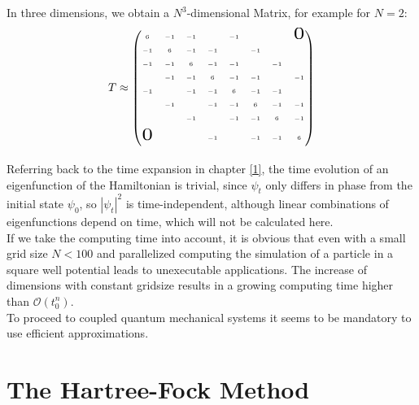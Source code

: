 \documentclass[twoside,        %
			   11pt,			%
               BCOR10mm,       %
               ngerman,english  %
               ]{scrartcl}
\begin{document}
In three dimensions, we obtain a $N^3$-dimensional Matrix, for example for $N=2$:
\begin{align*}
T \approx
\tiny
\begin{pmatrix}
 6 & -1 & -1 &  & -1 &  &  & \scalebox{3}{$0$}  \\\\
   -1 & 6 & -1 & -1 &  & -1 &  & \\\\
     -1 & -1 & 6 & -1 & -1 &  & -1 & \\\\
        & -1 & -1 & 6 & -1 & -1 &  & -1\\\\
        -1 &  & -1 & -1 & 6 & -1 & -1 & \\\\
           & -1 &  & -1 & -1 & 6 & -1 & -1\\\\
             &  & -1 &  & -1 & -1 & 6 & -1\\\\
              \scalebox{3}{$0$}  &  &  & -1 &  & -1 & -1 & 6\\\\
              \end{pmatrix}
\end{align*}

Referring back to the time expansion in chapter \ref{1}, the time evolution of an eigenfunction of the Hamiltonian is trivial, since $\psi_t$ only differs in phase from the initial state $\psi_0$, so ${|\psi_t|}^2$ is time-independent, although linear combinations of eigenfunctions depend on time, which will not be calculated here.\\

If we take the computing time into account, it is obvious that even with a small grid size $N<100$ and parallelized computing the simulation of a particle in a square well potential leads to unexecutable applications. The increase of dimensions with constant gridsize results in a growing computing time higher than $\mathcal O (t_0^n)$. \\

To proceed to coupled quantum mechanical systems it seems to be mandatory to use efficient approximations.

\newpage


\section{The Hartree-Fock Method}\label{CH:HF}
    
\end{document}
